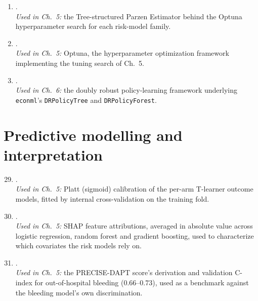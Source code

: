 \begin{enumerate}
  \item \citet{bergstra2011tpe}.
    \\\textit{Used in Ch.~5:} the Tree-structured Parzen Estimator behind
    the Optuna hyperparameter search for each risk-model family.

  \item \citet{akiba2019optuna}.
    \\\textit{Used in Ch.~5:} Optuna, the hyperparameter optimization
    framework implementing the tuning search of Ch.~5.

  \item \citet{athey2021policylearning}.
    \\\textit{Used in Ch.~6:} the doubly robust policy-learning framework
    underlying \texttt{econml}'s \texttt{DRPolicyTree} and
    \texttt{DRPolicyForest}.
\end{enumerate}

\section{Predictive modelling and interpretation}

\begin{enumerate}\setcounter{enumi}{28}
  \item \citet{platt1999}.
    \\\textit{Used in Ch.~5:} Platt (sigmoid) calibration of the per-arm
    T-learner outcome models, fitted by internal cross-validation on the
    training fold.

  \item \citet{lundberg2017shap}.
    \\\textit{Used in Ch.~5:} SHAP feature attributions, averaged in
    absolute value across logistic regression, random forest and gradient
    boosting, used to characterize which covariates the risk models rely on.

  \item \citet{costa2017precisedapt}.
    \\\textit{Used in Ch.~5:} the PRECISE-DAPT score's derivation and
    validation C-index for out-of-hospital bleeding (0.66--0.73), used as
    a benchmark against the bleeding model's own discrimination.
\end{enumerate}

